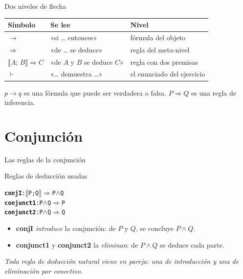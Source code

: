 \documentclass[11pt,aspectratio=169]{beamer}
\newcommand{\sAnd}{\(\wedge\)}
\newcommand{\sMeta}{\(\Longrightarrow\)}
\newcommand{\sLb}{\(\llbracket\)}
\newcommand{\sRb}{\(\rrbracket\)}
\newcommand{\Rn}[1]{\textcolor{granate}{\textbf{#1}}}
\newcommand{\nota}[1]{{\small\itshape\color{gray} #1}}
\begin{document}
\begin{frame}{Dos niveles de flecha}
  \begin{center}
  \begin{tabular}{lll}
    \toprule
    \bfseries Símbolo & \bfseries Se lee & \bfseries Nivel\\
    \midrule
    
    $\longrightarrow$ & «si \ldots{} entonces» & fórmula del \alert{objeto}\\
    
    $\Longrightarrow$ & «de \ldots{} se deduce» & regla del \alert{meta-nivel}\\
    
    $\llbracket A;\, B \rrbracket \Longrightarrow C$ & «de $A$ y $B$ se deduce $C$» & regla con dos premisas\\
    
    $\vdash$ & «\ldots{} demuestra \ldots» & el enunciado del ejercicio\\
    \bottomrule
  \end{tabular}
  \end{center}
  \vfill
  
  \begin{center}
    \alert{$p \longrightarrow q$ es una fórmula que puede ser verdadera o
    falsa. $P \Longrightarrow Q$ es una regla de inferencia.}
  \end{center}
\end{frame}

\section{Conjunción}

\begin{frame}[fragile]{Las reglas de la conjunción}
  \begin{block}{Reglas de deducción usadas}
\begin{alltt}\footnotesize
\Rn{conjI}:      \sLb{}P; Q\sRb{} \sMeta{} P \sAnd{} Q
\Rn{conjunct1}: P \sAnd{} Q \sMeta{} P
\Rn{conjunct2}: P \sAnd{} Q \sMeta{} Q
\end{alltt}
\end{block}
  
  \begin{itemize}
    \item \Rn{conjI} \emph{introduce} la conjunción: de $P$ y $Q$, se
      concluye $P \wedge Q$.
    
    \item \Rn{conjunct1} y \Rn{conjunct2} la \emph{eliminan}: de
      $P \wedge Q$ se deduce cada parte.
  \end{itemize}
  \vfill
  
  \nota{Toda regla de deducción natural viene en pareja:
  una de introducción y una de eliminación por conectivo.}
\end{frame}
\end{document}
